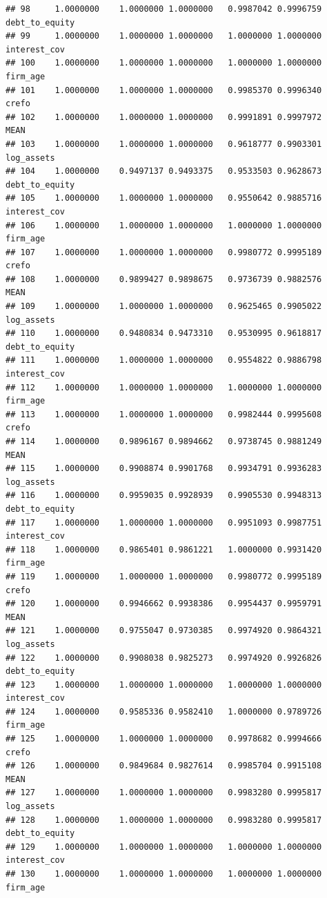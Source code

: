 \documentclass[
]{article}
\begin{document}
\begin{verbatim}
## 98     1.0000000    1.0000000 1.0000000   0.9987042 0.9996759 debt_to_equity
## 99     1.0000000    1.0000000 1.0000000   1.0000000 1.0000000   interest_cov
## 100    1.0000000    1.0000000 1.0000000   1.0000000 1.0000000       firm_age
## 101    1.0000000    1.0000000 1.0000000   0.9985370 0.9996340          crefo
## 102    1.0000000    1.0000000 1.0000000   0.9991891 0.9997972           MEAN
## 103    1.0000000    1.0000000 1.0000000   0.9618777 0.9903301     log_assets
## 104    1.0000000    0.9497137 0.9493375   0.9533503 0.9628673 debt_to_equity
## 105    1.0000000    1.0000000 1.0000000   0.9550642 0.9885716   interest_cov
## 106    1.0000000    1.0000000 1.0000000   1.0000000 1.0000000       firm_age
## 107    1.0000000    1.0000000 1.0000000   0.9980772 0.9995189          crefo
## 108    1.0000000    0.9899427 0.9898675   0.9736739 0.9882576           MEAN
## 109    1.0000000    1.0000000 1.0000000   0.9625465 0.9905022     log_assets
## 110    1.0000000    0.9480834 0.9473310   0.9530995 0.9618817 debt_to_equity
## 111    1.0000000    1.0000000 1.0000000   0.9554822 0.9886798   interest_cov
## 112    1.0000000    1.0000000 1.0000000   1.0000000 1.0000000       firm_age
## 113    1.0000000    1.0000000 1.0000000   0.9982444 0.9995608          crefo
## 114    1.0000000    0.9896167 0.9894662   0.9738745 0.9881249           MEAN
## 115    1.0000000    0.9908874 0.9901768   0.9934791 0.9936283     log_assets
## 116    1.0000000    0.9959035 0.9928939   0.9905530 0.9948313 debt_to_equity
## 117    1.0000000    1.0000000 1.0000000   0.9951093 0.9987751   interest_cov
## 118    1.0000000    0.9865401 0.9861221   1.0000000 0.9931420       firm_age
## 119    1.0000000    1.0000000 1.0000000   0.9980772 0.9995189          crefo
## 120    1.0000000    0.9946662 0.9938386   0.9954437 0.9959791           MEAN
## 121    1.0000000    0.9755047 0.9730385   0.9974920 0.9864321     log_assets
## 122    1.0000000    0.9908038 0.9825273   0.9974920 0.9926826 debt_to_equity
## 123    1.0000000    1.0000000 1.0000000   1.0000000 1.0000000   interest_cov
## 124    1.0000000    0.9585336 0.9582410   1.0000000 0.9789726       firm_age
## 125    1.0000000    1.0000000 1.0000000   0.9978682 0.9994666          crefo
## 126    1.0000000    0.9849684 0.9827614   0.9985704 0.9915108           MEAN
## 127    1.0000000    1.0000000 1.0000000   0.9983280 0.9995817     log_assets
## 128    1.0000000    1.0000000 1.0000000   0.9983280 0.9995817 debt_to_equity
## 129    1.0000000    1.0000000 1.0000000   1.0000000 1.0000000   interest_cov
## 130    1.0000000    1.0000000 1.0000000   1.0000000 1.0000000       firm_age

\end{verbatim}
\end{document}
